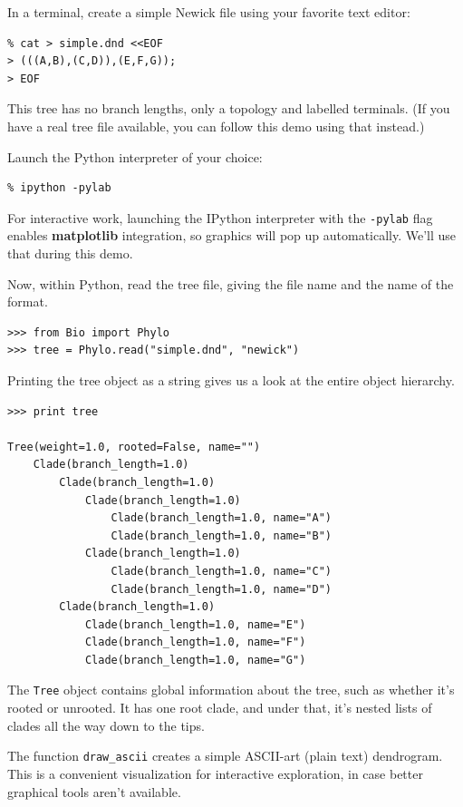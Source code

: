 \documentclass{report}
\begin{document}
In a terminal, create a simple Newick file using your favorite text editor:

\begin{verbatim}
% cat > simple.dnd <<EOF
> (((A,B),(C,D)),(E,F,G));
> EOF
\end{verbatim}

This tree has no branch lengths, only a topology and labelled terminals. (If you have a real
tree file available, you can follow this demo using that instead.)

Launch the Python interpreter of your choice:

\begin{verbatim}
% ipython -pylab
\end{verbatim}

For interactive work, launching the IPython interpreter with the \verb|-pylab| flag enables
\textbf{matplotlib} integration, so graphics will pop up automatically. We'll use that during
this demo.

Now, within Python, read the tree file, giving the file name and the name of the format.

\begin{verbatim}
>>> from Bio import Phylo
>>> tree = Phylo.read("simple.dnd", "newick")
\end{verbatim}

Printing the tree object as a string gives us a look at the entire object hierarchy.

\begin{verbatim}
>>> print tree

Tree(weight=1.0, rooted=False, name="")
    Clade(branch_length=1.0)
        Clade(branch_length=1.0)
            Clade(branch_length=1.0)
                Clade(branch_length=1.0, name="A")
                Clade(branch_length=1.0, name="B")
            Clade(branch_length=1.0)
                Clade(branch_length=1.0, name="C")
                Clade(branch_length=1.0, name="D")
        Clade(branch_length=1.0)
            Clade(branch_length=1.0, name="E")
            Clade(branch_length=1.0, name="F")
            Clade(branch_length=1.0, name="G")
\end{verbatim}

The \texttt{Tree} object contains global information about the tree, such as whether it's
rooted or unrooted. It has one root clade, and under that, it's nested lists of clades all the
way down to the tips.

The function \verb|draw_ascii| creates a simple ASCII-art (plain text) dendrogram.  This is a
convenient visualization for interactive exploration, in case better graphical tools aren't
available.
\end{document}

